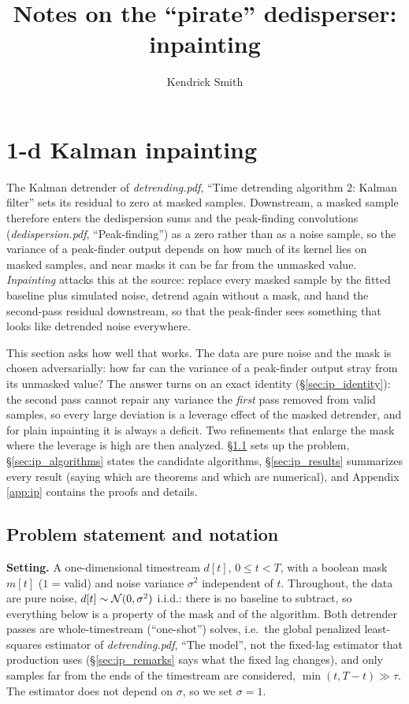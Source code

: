 \documentclass{article}
\title{Notes on the ``pirate'' dedisperser: inpainting}
\author{Kendrick Smith}
\numberwithin{equation}{section}   %
\newcommand{\ddnotes}[1]{{\em dedispersion.pdf}, ``#1''}
\newcommand{\dtnotes}[1]{{\em detrending.pdf}, ``#1''}
\begin{document}
\maketitle

\tableofcontents

\setlength{\parskip}{2.5pt}  %

\clearpage

\section{1-d Kalman inpainting}
\label{sec:inpainting}

The Kalman detrender of \dtnotes{Time detrending algorithm 2: Kalman filter} sets its residual to zero at
masked samples.  Downstream, a masked sample therefore enters the dedispersion sums and the peak-finding
convolutions (\ddnotes{Peak-finding}) as a zero rather than as a noise sample, so the variance of a
peak-finder output depends on how much of its kernel lies on masked samples, and near masks it can be far
from the unmasked value.  {\em Inpainting} attacks this at the source: replace every masked sample by the
fitted baseline plus simulated noise, detrend again without a mask, and hand the second-pass residual
downstream, so that the peak-finder sees something that looks like detrended noise everywhere.

This section asks how well that works.  The data are pure noise and the mask is chosen adversarially:
how far can the variance of a peak-finder output stray from its unmasked value?  The answer turns on an
exact identity (\S\ref{sec:ip_identity}): the second pass cannot repair any variance the {\em first} pass
removed from valid samples, so every large deviation is a leverage effect of the masked detrender, and
for plain inpainting it is always a deficit.  Two refinements that enlarge the mask where the leverage is
high are then analyzed.  \S\ref{sec:ip_setup} sets up the problem, \S\ref{sec:ip_algorithms} states the
candidate algorithms, \S\ref{sec:ip_results} summarizes every result (saying which are theorems and which
are numerical), and Appendix \ref{app:ip} contains the proofs and details.

\subsection{Problem statement and notation}
\label{sec:ip_setup}

{\bf Setting.}  A one-dimensional timestream $d[t]$, $0 \le t < T$, with a boolean mask $m[t]$ ($1$ = valid)
and noise variance $\sigma^2$ independent of $t$.  Throughout, the data are pure noise,
$d[t] \sim {\cal N}(0,\sigma^2)$ i.i.d.: there is no baseline to subtract, so everything below is a property
of the mask and of the algorithm.  Both detrender passes are whole-timestream (``one-shot'') solves, i.e.\
the global penalized least-squares estimator of \dtnotes{The model}, not the fixed-lag estimator that
production uses (\S\ref{sec:ip_remarks} says what the fixed lag changes), and only samples far from the
ends of the timestream are considered, $\min(t, T-t) \gg \tau$.  The estimator does not depend on
$\sigma$, so we set $\sigma = 1$.
\end{document}
